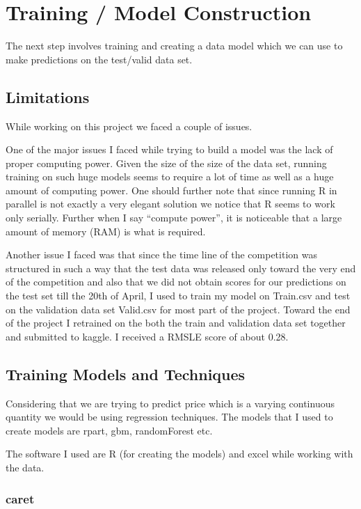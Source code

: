\documentclass[paper=a4, fontsize=11pt]{scrartcl}	%
\numberwithin{equation}{section}		%
\numberwithin{figure}{section}			%
\numberwithin{table}{section}				%
\begin{document}
\section{Training / Model Construction}

The next step involves training and creating a data model which we can use to make predictions on the test/valid data set.

\subsection{Limitations}

While working on this project we faced a couple of issues.

One of the major issues I faced while trying to build a model was the lack of proper computing power. Given the size of the size of the data set, running training on such huge models seems to require a lot of time as well as a huge amount of computing power. One should further note that since running R in parallel is not exactly a very elegant solution we notice that R seems to work only serially. Further when I say “compute power”, it is noticeable that a large amount of memory (RAM) is what is required. 

Another issue I faced was that since the time line of the competition was structured in such a way that the test data was released only toward the very end of the competition and also that we did not obtain scores for our predictions on the test set till the 20th of April, I used to train my model on Train.csv and test on the validation data set Valid.csv for most part of the project. Toward the end of the project I retrained on the both the train and validation data set together and submitted to kaggle. I received a RMSLE score of about 0.28. 

\subsection{Training Models and Techniques}

Considering that we are trying to predict price which is a varying continuous quantity we would be using regression techniques. The models that I used to create models are rpart, gbm, randomForest etc.

The software I used are R (for creating the models) and excel while working with the data.

\subsubsection{caret}
\end{document}
